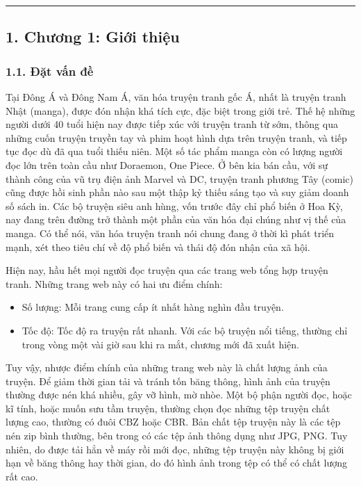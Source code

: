 \documentclass[
]{article}
\providecommand{\tightlist}{%
  \setlength{\itemsep}{0pt}\setlength{\parskip}{0pt}}
\begin{document}
\begin{center}\rule{0.5\linewidth}{0.5pt}\end{center}

\hypertarget{chux1b0ux1a1ng-1-giux1edbi-thiux1ec7u}{%
\subsection{\texorpdfstring{1. Chương 1: Giới thiệu
}{1. Chương 1: Giới thiệu }}\label{chux1b0ux1a1ng-1-giux1edbi-thiux1ec7u}}

\hypertarget{ux111ux1eb7t-vux1ea5n-ux111ux1ec1}{%
\subsubsection{\texorpdfstring{1.1. Đặt vấn đề
}{1.1. Đặt vấn đề }}\label{ux111ux1eb7t-vux1ea5n-ux111ux1ec1}}

Tại Đông Á và Đông Nam Á, văn hóa truyện tranh gốc Á, nhất là truyện
tranh Nhật (manga), được đón nhận khá tích cực, đặc biệt trong giới trẻ.
Thế hệ những người dưới 40 tuổi hiện nay được tiếp xúc với truyện tranh
từ sớm, thông qua những cuốn truyện truyền tay và phim hoạt hình dựa
trên truyện tranh, và tiếp tục đọc dù đã qua tuổi thiếu niên. Một số tác
phẩm manga còn có lượng người đọc lớn trên toàn cầu như Doraemon, One
Piece. Ở bên kia bán cầu, với sự thành công của vũ trụ điện ảnh Marvel
và DC, truyện tranh phương Tây (comic) cũng được hồi sinh phần nào sau
một thập kỷ thiếu sáng tạo và suy giảm doanh số sách in. Các bộ truyện
siêu anh hùng, vốn trước đây chỉ phổ biến ở Hoa Kỳ, nay đang trên đường
trở thành một phần của văn hóa đại chúng như vị thế của manga. Có thể
nói, văn hóa truyện tranh nói chung đang ở thời kì phát triển mạnh, xét
theo tiêu chí về độ phổ biến và thái độ đón nhận của xã hội.

Hiện nay, hầu hết mọi người đọc truyện qua các trang web tổng hợp truyện
tranh. Những trang web này có hai ưu điểm chính:

\begin{itemize}
\tightlist
\item
  Số lượng: Mỗi trang cung cấp ít nhất hàng nghìn đầu truyện.
\item
  Tốc độ: Tốc độ ra truyện rất nhanh. Với các bộ truyện nổi tiếng,
  thường chỉ trong vòng một vài giờ sau khi ra mắt, chương mới đã xuất
  hiện.
\end{itemize}

Tuy vậy, nhược điểm chính của những trang web này là chất lượng ảnh của
truyện. Để giảm thời gian tải và tránh tốn băng thông, hình ảnh của
truyện thường được nén khá nhiều, gây vỡ hình, mờ nhòe. Một bộ phận
người đọc, hoặc kĩ tính, hoặc muốn sưu tầm truyện, thường chọn đọc những
tệp truyện chất lượng cao, thường có đuôi CBZ hoặc CBR. Bản chất tệp
truyện này là các tệp nén zip bình thường, bên trong có các tệp ảnh
thông dụng như JPG, PNG. Tuy nhiên, do được tải hẳn về máy rồi mới đọc,
những tệp truyện này không bị giới hạn về băng thông hay thời gian, do
đó hình ảnh trong tệp có thể có chất lượng rất cao.
\end{document}
